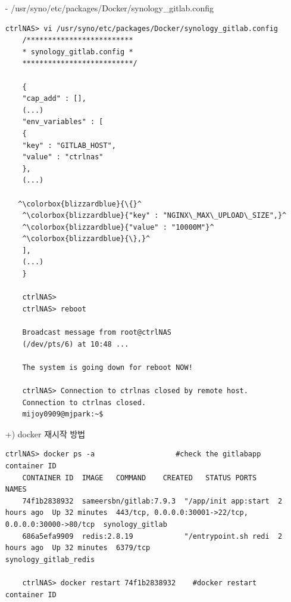 \documentclass[11pt
  , a4paper
  , article
  , oneside
]{memoir}
\begin{document}
\begin{itemize}
\begin{itemize}
\begin{enumerate}
{\begin{lstlisting}[style=termstyle, escapechar=!]
	(...)
	HOSTNAME="ctrlnas"
	ADMIN_EMAIL="mijoy0909@ibs.re.kr"
	!\colorbox{blizzardblue}{NGINX\_MAX\_UPLOAD\_SIZE="10000M"}!
	SMTP_ENABLE="false"
	(...)
	\end{lstlisting}
	}
		
	
	
	\item[-] /usr/syno/etc/packages/Docker/synology\_gitlab.config
	{\scriptsize
	\begin{lstlisting}[style=termstyle, escapechar=^]
	ctrlNAS> vi /usr/syno/etc/packages/Docker/synology_gitlab.config
	/*************************
	* synology_gitlab.config *
	**************************/
	
	{
	"cap_add" : [],
	(...)
	"env_variables" : [      
	{
	"key" : "GITLAB_HOST",
	"value" : "ctrlnas"
	},
	(...)
   
   ^\colorbox{blizzardblue}{\{}^                                                                     
	^\colorbox{blizzardblue}{"key" : "NGINX\_MAX\_UPLOAD\_SIZE",}^                                       
	^\colorbox{blizzardblue}{"value" : "10000M"}^                                                          
	^\colorbox{blizzardblue}{\},}^             
	], 
	(...)
	}
	
	ctrlNAS>
	ctrlNAS> reboot

	Broadcast message from root@ctrlNAS
	(/dev/pts/6) at 10:48 ...
	
	The system is going down for reboot NOW!
	
	ctrlNAS> Connection to ctrlnas closed by remote host.
	Connection to ctrlnas closed.
	mijoy0909@mjpark:~$  
	\end{lstlisting}
	}
	
	\item[+)] docker 재시작 방법
	{\scriptsize
	\begin{lstlisting}[style=termstyle]
	ctrlNAS> docker ps -a                   #check the gitlabapp container ID
	CONTAINER ID  IMAGE   COMMAND    CREATED   STATUS PORTS     NAMES
	74f1b2838932  sameersbn/gitlab:7.9.3  "/app/init app:start  2 hours ago  Up 32 minutes  443/tcp, 0.0.0.0:30001->22/tcp, 0.0.0.0:30000->80/tcp  synology_gitlab   
	686a5efa9909  redis:2.8.19            "/entrypoint.sh redi  2 hours ago  Up 32 minutes  6379/tcp                                               synology_gitlab_redis   
	
	ctrlNAS> docker restart 74f1b2838932    #docker restart container ID
	\end{lstlisting}
	}	
\end{enumerate}	
\end{itemize}	
\end{itemize}









\clearpage


\end{document}
